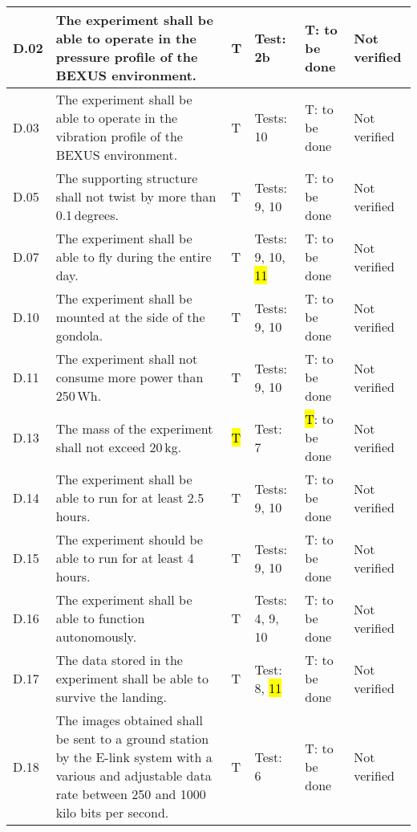 \begin{longtable}[]{|m{}| m{}|m{}|m{}|m{}|m{}|}
D.02 & The experiment shall be able to operate in the pressure profile of the BEXUS environment.
& T & Test: 2b  & T: to be done & Not verified \\\hline

D.03 & The experiment shall be able to operate in the vibration profile of the BEXUS environment.
& T & Tests: 10 & T: to be done & Not verified \\\hline

D.05 & The supporting structure shall not twist by more than 0.1\,degrees.
& T & Tests: 9, 10 & T: to be done & Not verified \\\hline

D.07 & The experiment shall be able to fly during the entire day.
& T & Tests: 9, 10, \hl{11} & T: to be done & Not verified \\\hline

D.10 & The experiment shall be mounted at the side of the gondola.
& T & Tests: 9, 10 & T: to be done & Not verified \\\hline

D.11 & The experiment shall not consume more power than 250\,Wh.
& T & Tests: 9, 10 & T: to be done & Not verified \\\hline

D.13 & The mass of the experiment shall not exceed 20\,kg.
& \hl{T} & Test: 7 & \hl{T}: to be done & Not verified \\\hline

D.14 & The experiment shall be able to run for at least 2.5\,hours.
& T & Tests: 9, 10 & T: to be done & Not verified \\\hline

D.15 & The experiment should be able to run for at least 4\,hours.
& T & Tests: 9, 10 & T: to be done & Not verified \\\hline

D.16 & The experiment shall be able to function autonomously.
& T & Tests: 4, 9, 10 & T: to be done & Not verified \\\hline

D.17 & The data stored in the experiment shall be able to survive the landing.
& T & Test: 8, \hl{11} & T: to be done & Not verified \\\hline

\rowcolor{yellow} D.18 & The images obtained shall be sent to a ground station by the E-link system with a various and adjustable data rate between 250 and 1000 kilo bits per second.
& T & Test: 6 & T: to be done & Not verified \\\hline





\end{longtable}
